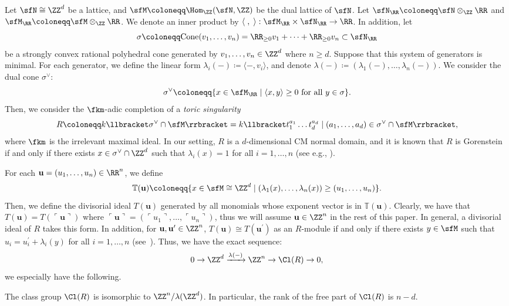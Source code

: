 Let $\sfN\cong\ZZ^d$ be a lattice, and $\sfM\coloneqq\Hom_\ZZ(\sfN, \ZZ)$ be the dual lattice of $\sfN$. Let $\sfN_\RR\coloneqq\sfN\otimes_\ZZ\RR$ and $\sfM_\RR\coloneqq\sfM\otimes_\ZZ\RR$. We denote an inner product by $\langle\;,\;\rangle:\sfM_\RR\times\sfN_\RR\rightarrow\RR$. In addition, let
\[
\sigma\coloneqq\mathrm{Cone}(v_1, \ldots, v_n)=\RR_{\ge 0}v_1+\dots +\RR_{\ge 0}v_n
\subset\sfN_\RR
\]
be a strongly convex rational polyhedral cone generated by $v_1, \ldots, v_n\in\ZZ^d$ where $n\ge d$. Suppose that this system of generators is minimal. For each generator, we define the linear form $\lambda_i(-)\coloneqq\langle-, v_i\rangle$, and denote $\lambda(-)\coloneqq(\lambda_1(-),\dots,\lambda_n(-))$. We consider the dual cone $\sigma^\vee$:
\[
\sigma^\vee\coloneqq\{x\in\sfM_\RR \mid \langle x,y\rangle\ge0 \text{ for all } y\in\sigma \}.
\]
Then, we consider the $\fkm$-adic completion of a \emph{toric singularity}
\[
R\coloneqq k\llbracket \sigma^\vee\cap\sfM\rrbracket =k\llbracket t_1^{a_1}\dots t_d^{a_d}\mid (a_1, \ldots, a_d)\in\sigma^\vee\cap\sfM\rrbracket ,
\]
where $\fkm$ is the irrelevant maximal ideal. In our setting, $R$ is a $d$-dimensional CM normal domain, and it is known that $R$ is Gorenstein if and only if there exists $x\in\sigma^\vee\cap\ZZ^d$ such that $\lambda_i(x)=1$ for all $i=1, \ldots, n$ (see e.g., \cite[Theorem~6.33]{BG2}).

For each $\mathbf{u}=(u_1, \ldots, u_n)\in\RR^n$, we define
\[
\mathbb{T}(\mathbf{u})\coloneqq\{x\in\sfM\cong\ZZ^d \mid (\lambda_1(x), \ldots, \lambda_n(x))\ge(u_1, \ldots, u_n)\}.
\]
Then, we define the divisorial ideal $T(\mathbf{u})$ generated by all monomials whose exponent vector is in $\mathbb{T}(\mathbf{u})$. Clearly, we have that $T(\mathbf{u})=T(\ulcorner \mathbf{u}\urcorner)$ where $\ulcorner \mathbf{u}\urcorner=(\ulcorner u_1\urcorner, \ldots, \ulcorner u_n\urcorner)$, thus we will assume $\mathbf{u}\in\ZZ^n$ in the rest of this paper. In general, a divisorial ideal of $R$ takes this form. In addition, for $\mathbf{u}, \mathbf{u}^\prime\in\ZZ^n$, $T(\mathbf{u})\cong T(\mathbf{u}^\prime)$ as an $R$-module if and only if there exists $y\in\sfM$ such that $u_i=u_i^\prime+\lambda_i(y)$ for all $i=1, \ldots, n$ (see~\cite[Corollary~4.56]{BG2}). Thus, we have the exact sequence:
\[
0\rightarrow\ZZ^d\xrightarrow{\lambda(-)}\ZZ^n\rightarrow\Cl(R)\rightarrow0,
\]
we especially have the following.

\begin{lemm}\label{cl_toric}
The class group $\Cl(R)$ is isomorphic to $\ZZ^n/\lambda(\ZZ^d)$. In particular, the rank of the free part of $\Cl(R)$ is $n-d$.
\end{lemm}

